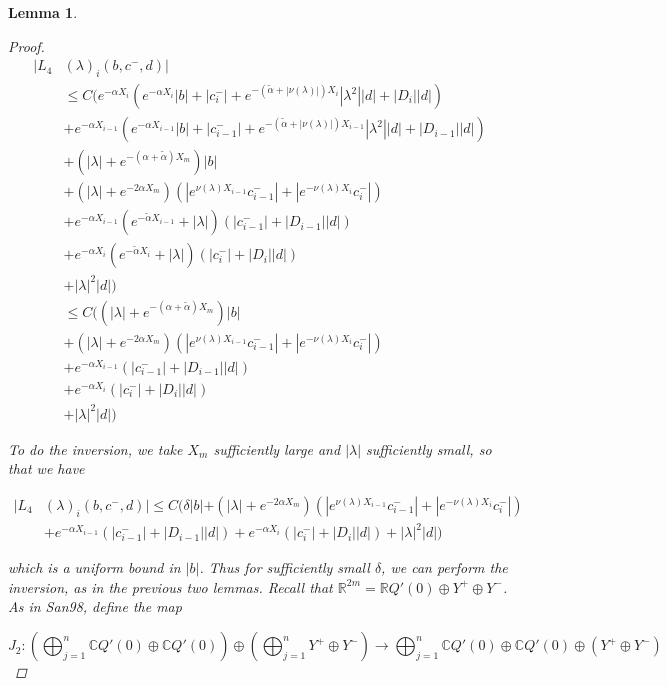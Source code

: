\documentclass[12pt]{article}
\def\R{{\mathbb R}}
\def\C{{\mathbb C}}
\newtheorem{lemma}{Lemma}
\begin{document}
\begin{lemma}
\begin{proof}
\begin{align*}
|L_4&(\lambda)_i(b, c^-, d)|\\ 
&\leq C \Big( e^{-\alpha X_i} ( e^{-\alpha X_i} |b| + |c_i^-| + e^{-(\tilde{\alpha}+|\nu(\lambda)|) X_i} |\lambda^2| |d| + |D_i||d| ) \\
&+  e^{-\alpha X_{i-1}} ( e^{-\alpha X_{i-1}} |b| + |c_{i-1}^-| + e^{-(\tilde{\alpha}+|\nu(\lambda)|) X_{i-1}} |\lambda^2| |d| + |D_{i-1}||d| ) \\
&+ (|\lambda| + e^{-(\alpha + \tilde{\alpha}) X_m})|b| \\
&+ (|\lambda| + e^{-2 \alpha X_m})( |e^{\nu(\lambda)X_{i-1}} c_{i-1}^-| + |e^{-\nu(\lambda)X_i} c_i^-|) \\
&+ e^{-\alpha X_{i-1}}( e^{-\tilde{\alpha} X_{i-1}} + |\lambda|)( |c_{i-1}^-| + |D_{i-1}||d| ) \\
&+ e^{-\alpha X_i}( e^{-\tilde{\alpha} X_i} + |\lambda|)( |c_i^-| + |D_i||d| ) \\
&+ |\lambda|^2 |d|  \Big) \\
&\leq C \Big( 
(|\lambda| + e^{-(\alpha + \tilde{\alpha}) X_m})|b| \\
&+ (|\lambda| + e^{-2 \alpha X_m})( |e^{\nu(\lambda)X_{i-1}} c_{i-1}^-| + |e^{-\nu(\lambda)X_i} c_i^-|) \\
&+ e^{-\alpha X_{i-1}}( |c_{i-1}^-| + |D_{i-1}||d| ) \\
&+ e^{-\alpha X_i}( |c_i^-| + |D_i||d| ) \\
&+ |\lambda|^2 |d|  \Big)
\end{align*}

To do the inversion, we take $X_m$ sufficiently large and $|\lambda|$ sufficiently small, so that we have

\begin{align*}
|L_4&(\lambda)_i(b, c^-, d)| \leq C \Big( 
\delta |b| + (|\lambda| + e^{-2 \alpha X_m})( |e^{\nu(\lambda)X_{i-1}} c_{i-1}^-| + |e^{-\nu(\lambda)X_i} c_i^-|) \\
&+ e^{-\alpha X_{i-1}}(|c_{i-1}^-| + |D_{i-1}||d| ) + e^{-\alpha X_i}( |c_i^-| + |D_i||d| ) + |\lambda|^2 |d|  \Big)
\end{align*}

which is a uniform bound in $|b|$. Thus for sufficiently small $\delta$, we can perform the inversion, as in the previous two lemmas. Recall that $\R^{2m} = \R Q'(0) \oplus Y^+ \oplus Y^-$. As in San98, define the map

\[
J_2: \left( \bigoplus_{j=1}^n \C Q'(0) \oplus \C Q'(0) \right) \oplus
\left( \bigoplus_{j=1}^n Y^+ \oplus Y^- \right) 
\rightarrow \bigoplus_{j=1}^n \C Q'(0) \oplus \C Q'(0) \oplus (Y^+ \oplus Y^-)
\]


\end{proof}
\end{lemma}
\end{document}
